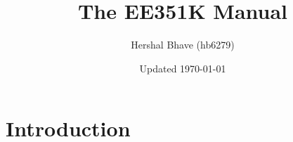 \documentclass[12pt]{book}
\title{The EE351K Manual}
\author{Hershal Bhave (hb6279)}
\date{Updated \today}
\begin{document}
\maketitle
\tableofcontents
\chapter{Introduction}

\printglossaries
\end{document}
